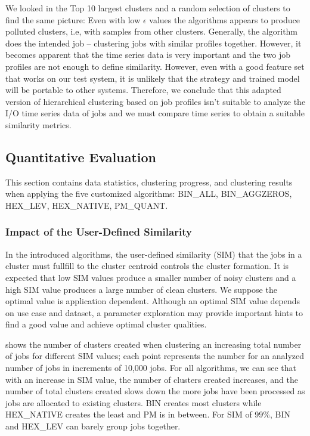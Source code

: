 \documentclass{jhps}
\begin{document}
We looked in the Top 10 largest clusters and a random selection of clusters to find the same picture:
Even with low $\epsilon$ values the algorithms appears to produce polluted clusters, i.e, with samples from other clusters.
Generally, the algorithm does the intended job -- clustering jobs with similar profiles together.
However, it becomes apparent that the time series data is very important and the two job profiles are not enough to define similarity.
However, even with a good feature set that works on our test system, it is unlikely that the strategy and trained model will be portable to other systems.
Therefore, we conclude that this adapted version of hierarchical clustering based on job profiles isn't suitable to analyze the I/O time series data of jobs and we must compare time series to obtain a suitable similarity metrics.

\subsection{Quantitative Evaluation}
This section contains data statistics, clustering progress, and clustering results when applying the five customized algorithms: BIN\_ALL,  BIN\_AGGZEROS, HEX\_LEV, HEX\_NATIVE, PM\_QUANT.

\subsubsection{Impact of the User-Defined Similarity}
In the introduced algorithms, the user-defined similarity (SIM) that the jobs in a cluster must fullfill to the cluster centroid controls the cluster formation.
It is expected that low SIM values produce a smaller number of noisy clusters and a high SIM value produces a large number of clean clusters.
We suppose the optimal value is application dependent.
Although an optimal SIM value depends on use case and dataset, a parameter exploration may provide important hints to find a good value and achieve optimal cluster qualities.

 shows the number of clusters created when clustering an increasing total number of jobs for different SIM values; each point represents the number for an analyzed number of jobs in increments of 10,000 jobs.
For all algorithms, we can see that with an increase in SIM value, the number of clusters created increases, and the number of total clusters created slows down the more jobs have been processed as jobs are allocated to existing clusters.
BIN creates most clusters while HEX\_NATIVE creates the least and PM is in between.
For SIM of 99\%, BIN and HEX\_LEV can barely group jobs together.
\end{document}
